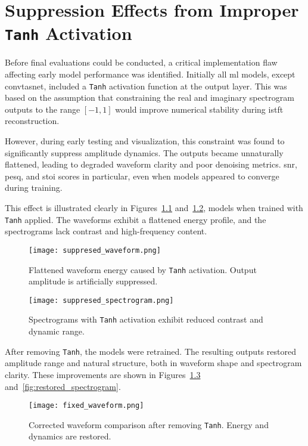 \graphicspath{{content/appendices/figures}}
\chapter{Suppression Effects from Improper \texttt{Tanh} Activation}
\label{appendix:tanh_removal}

Before final evaluations could be conducted, a critical implementation flaw affecting early model performance was identified. Initially all \gls{ml} models, except \gls{convtasnet}, included a \texttt{Tanh} activation function at the output layer. This was based on the assumption that constraining the real and imaginary spectrogram outputs to the range \([-1, 1]\) would improve numerical stability during \gls{istft} reconstruction.

However, during early testing and visualization, this constraint was found to significantly suppress amplitude dynamics. The outputs became unnaturally flattened, leading to degraded waveform clarity and poor denoising metrics. \gls{snr}, \gls{pesq}, and \gls{stoi} scores in particular, even when models appeared to converge during training.

This effect is illustrated clearly in Figures~\ref{fig:suppresed_waveform} and~\ref{fig:suppresed_spectrogram}, models when trained with \texttt{Tanh} applied. The waveforms exhibit a flattened energy profile, and the spectrograms lack contrast and high-frequency content.

\begin{figure}[H]
    \centering
    \texttt{[image: suppresed\_waveform.png]}
    \caption{\label{fig:suppresed_waveform} Flattened waveform energy caused by \texttt{Tanh} activation. Output amplitude is artificially suppressed.}
\end{figure}

\begin{figure}[H]
    \centering
    \texttt{[image: suppresed\_spectrogram.png]}
    \caption{\label{fig:suppresed_spectrogram} Spectrograms with \texttt{Tanh} activation exhibit reduced contrast and dynamic range.}
\end{figure}

After removing \texttt{Tanh}, the models were retrained. The resulting outputs restored amplitude range and natural structure, both in waveform shape and spectrogram clarity. These improvements are shown in Figures~\ref{fig:restored_waveform} and~\ref{fig:restored_spectrogram}.

\begin{figure}[H]
    \centering
    \texttt{[image: fixed\_waveform.png]}
    \caption{\label{fig:restored_waveform} Corrected waveform comparison after removing \texttt{Tanh}. Energy and dynamics are restored.}
\end{figure}

